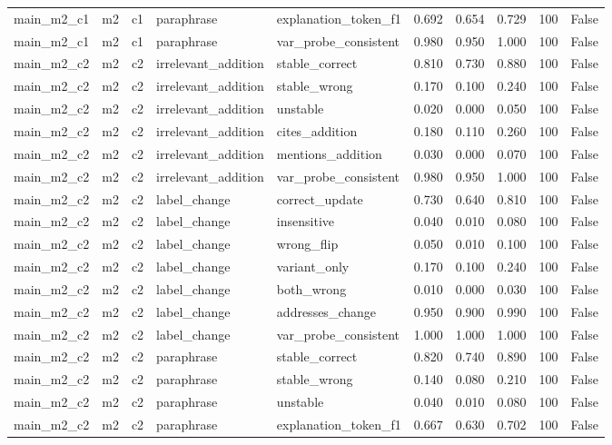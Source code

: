 \begin{tabular}{llllllllll}
main\_m2\_c1 & m2 & c1 & paraphrase & explanation\_token\_f1 & 0.692 & 0.654 & 0.729 & 100 & False \\
main\_m2\_c1 & m2 & c1 & paraphrase & var\_probe\_consistent & 0.980 & 0.950 & 1.000 & 100 & False \\
main\_m2\_c2 & m2 & c2 & irrelevant\_addition & stable\_correct & 0.810 & 0.730 & 0.880 & 100 & False \\
main\_m2\_c2 & m2 & c2 & irrelevant\_addition & stable\_wrong & 0.170 & 0.100 & 0.240 & 100 & False \\
main\_m2\_c2 & m2 & c2 & irrelevant\_addition & unstable & 0.020 & 0.000 & 0.050 & 100 & False \\
main\_m2\_c2 & m2 & c2 & irrelevant\_addition & cites\_addition & 0.180 & 0.110 & 0.260 & 100 & False \\
main\_m2\_c2 & m2 & c2 & irrelevant\_addition & mentions\_addition & 0.030 & 0.000 & 0.070 & 100 & False \\
main\_m2\_c2 & m2 & c2 & irrelevant\_addition & var\_probe\_consistent & 0.980 & 0.950 & 1.000 & 100 & False \\
main\_m2\_c2 & m2 & c2 & label\_change & correct\_update & 0.730 & 0.640 & 0.810 & 100 & False \\
main\_m2\_c2 & m2 & c2 & label\_change & insensitive & 0.040 & 0.010 & 0.080 & 100 & False \\
main\_m2\_c2 & m2 & c2 & label\_change & wrong\_flip & 0.050 & 0.010 & 0.100 & 100 & False \\
main\_m2\_c2 & m2 & c2 & label\_change & variant\_only & 0.170 & 0.100 & 0.240 & 100 & False \\
main\_m2\_c2 & m2 & c2 & label\_change & both\_wrong & 0.010 & 0.000 & 0.030 & 100 & False \\
main\_m2\_c2 & m2 & c2 & label\_change & addresses\_change & 0.950 & 0.900 & 0.990 & 100 & False \\
main\_m2\_c2 & m2 & c2 & label\_change & var\_probe\_consistent & 1.000 & 1.000 & 1.000 & 100 & False \\
main\_m2\_c2 & m2 & c2 & paraphrase & stable\_correct & 0.820 & 0.740 & 0.890 & 100 & False \\
main\_m2\_c2 & m2 & c2 & paraphrase & stable\_wrong & 0.140 & 0.080 & 0.210 & 100 & False \\
main\_m2\_c2 & m2 & c2 & paraphrase & unstable & 0.040 & 0.010 & 0.080 & 100 & False \\
main\_m2\_c2 & m2 & c2 & paraphrase & explanation\_token\_f1 & 0.667 & 0.630 & 0.702 & 100 & False \\

\end{tabular}
